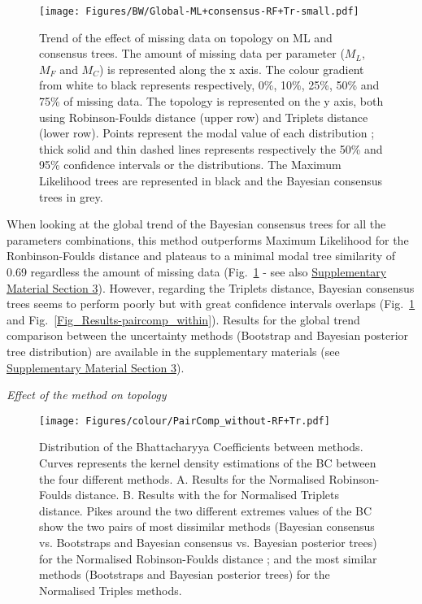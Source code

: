 \documentclass[12pt,letterpaper]{article}
\renewcommand{\subsection}[1]{%
\bigskip
\begin{center}
\begin{large}
\normalfont\itshape #1
\end{large}
\end{center}}
\begin{document}
\begin{figure} 
\centering
    \texttt{[image: Figures/BW/Global-ML+consensus-RF+Tr-small.pdf]}
\caption{Trend of the effect of missing data on topology on ML and consensus trees. The amount of missing data per parameter ($M_{L}$, $M_{F}$ and $M_{C}$) is represented along the x axis. The colour gradient from white to black represents respectively, 0\%, 10\%, 25\%, 50\% and 75\% of missing data. The topology is represented on the y axis, both using Robinson-Foulds distance (upper row) and Triplets distance (lower row). Points represent the modal value of each distribution ; thick solid and thin dashed lines represents respectively the 50\% and 95\% confidence intervals or the distributions. The Maximum Likelihood trees are represented in black and the Bayesian consensus trees in grey.}
\label{Fig_Results-global_perparam} %
\end{figure}

When looking at the global trend of the Bayesian consensus trees for all the parameters combinations, this method outperforms Maximum Likelihood for the Ronbinson-Foulds distance and plateaus to a minimal modal tree similarity of 0.69 regardless the amount of missing data (Fig.~\ref{Fig_Results-global_perparam} - see also \hyperref[SupplementaryMaterial]{Supplementary Material Section 3}). However, regarding the Triplets distance, Bayesian consensus trees seems to perform poorly but with great confidence intervals overlaps (Fig.~\ref{Fig_Results-global_perparam} and Fig.~\ref{Fig_Results-paircomp_within}). Results for the global trend comparison between the uncertainty methods (Bootstrap and Bayesian posterior tree distribution) are available in the supplementary materials (see \hyperref[SupplementaryMaterial]{Supplementary Material Section 3}).

\subsection{Effect of the method on topology}

\begin{figure} 
\centering
    \texttt{[image: Figures/colour/PairComp\_without-RF+Tr.pdf]}
\caption{Distribution of the Bhattacharyya Coefficients between methods. Curves represents the kernel density estimations of the BC between the four different methods. A. Results for the Normalised Robinson-Foulds distance. B. Results with the for Normalised Triplets distance. Pikes around the two different extremes values of the BC show the two pairs of most dissimilar methods (Bayesian consensus vs. Bootstraps and Bayesian consensus vs. Bayesian posterior trees) for the Normalised Robinson-Foulds distance ; and the most similar methods (Bootstraps and Bayesian posterior trees) for the Normalised Triples methods.}
\label{Fig_Results-paircomp_without} %
\end{figure}
\end{document}
